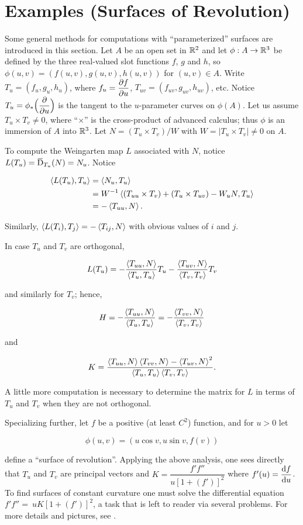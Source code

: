\documentclass[../main]{subfiles}
\begin{document}
\section{Examples (Surfaces of Revolution)}\label{ch03:s4}
Some general methods for computations with ``parameterized'' surfaces are introduced in this section. Let $A$ be an open set in $\mathbb{R}^2$ and let $\phi : A \to \mathbb{R}^3$ be defined by the three real-valued slot functions $f$, $g$ and $h$, so\newline  $\phi(u, v) = (f(u,v), g(u,v), h(u,v))$ for $(u, v) \in A$. Write $T_u = (f_u, g_u, h_u)$, where $f_u = \dfrac{\partial  f}{\partial  u}$, $T_{uv} = (f_{uv}, g_{uv}, h_{uv})$, etc. Notice $T_u = \phi_\ast \Big(\dfrac{\partial }{\partial  u}\Big)$ is the tangent to the $u$-parameter curves on $\phi(A)$. Let us assume $T_u \times T_v \ne 0$, where ``$\times$'' is the cross-product of advanced calculus; thus $\phi$ is an immersion of $A$ into $\mathbb{R}^3$. Let $N = (T_u \times T_v)/W$ with $W = |T_u \times T_v| \ne 0$ on $A$.

To compute the Weingarten map $L$ associated with $N$, notice $L(T_u) = \covariant_{T_u}(N) = N_u$. Notice

\begin{align*}
\left\langle L(T_u),T_u\right\rangle & = \left\langle N_u,T_u\right\rangle \\ & = W^{-1} \left\langle(T_{uu} \times T_v) + (T_u \times T_{uv}) - W_u N,T_u\right\rangle \\ & = -\left\langle T_{uu},N\right\rangle.
\end{align*}

Similarly, $\left\langle L(T_i),T_j\right\rangle = -\left\langle T_{ij},N\right\rangle$ with obvious values of $i$ and $j$. 

In case $T_u$ and $T_v$ are orthogonal, 

\[
L(T_u) = -\frac {\left\langle T_{u u},N\right\rangle} {\left\langle T_u,T_u\right\rangle} T_u - \frac {\left\langle T_{u v},N\right\rangle} {\left\langle T_v,T_v\right\rangle} T_v
\]

and similarly for $T_v$; hence, 

\[
H = -\frac {\left\langle T_{uu},N\right\rangle} {\left\langle T_u,T_u\right\rangle} = -\frac {\left\langle T_{vv},N\right\rangle} {\left\langle T_v,T_v\right\rangle}
\]

and

\[
K = \frac {\left\langle T_{uu},N\right\rangle \left\langle T_{vv},N\right\rangle - \left\langle T_{uv},N\right\rangle^2} {\left\langle T_u,T_u\right\rangle \left\langle T_v,T_v\right\rangle}.
\]

A little more computation is necessary to determine the matrix for $L$ in terms of $T_u$ and $T_v$ when they are not orthogonal.

Specializing further, let $f$ be a positive (at least $C^2$) function, and for $u > 0$ let 

\[
\phi(u, v) = (u \cos v, u \sin v, f(v))
\]

define a ``surface of revolution''. Applying the above analysis, one sees directly that $T_u$ and $T_v$ are principal vectors and $K = \dfrac{f' f''}{u[1 + (f')]^2}$ where $f'(u) = \dfrac{\mathrm{d}f}{\mathrm{d}u}$. To find surfaces of constant curvature one must solve the differential equation $f' f'' =\ u K [1 + (f')]^2$, a task that is left to reader via several problems. For more details and pictures, see \cite{struik1961lectures}.
\end{document}
